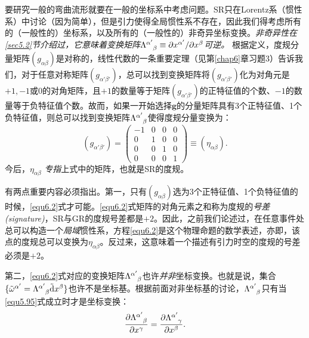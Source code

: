 要研究一般的弯曲流形就要在一般的坐标系中考虑问题。SR只在Lorentz系（惯性系）中讨论（因为简单），但是引力使得全局惯性系不存在，因此我们得考虑所有的（一般性的）坐标系，以及所有的（一般性的）非奇异坐标变换。\textit{非奇异性在\ref{sec5.2}节介绍过，它意味着变换矩阵$\Lambda\indices{^{\alpha'}_\beta} \equiv \partial x^{\alpha'} / \partial x^\beta$可逆。} 根据定义，度规分量矩阵$(g_{\alpha \beta})$是对称的，线性代数的一条重要定理（见第\ref{chap6}章习题3）告诉我们，对于任意对称矩阵$(g_{\alpha' \beta'})$，总可以找到变换矩阵将$(g_{\alpha' \beta'})$化为对角元是$+1, -1$或0的对角矩阵，且$+1$的数量等于矩阵$(g_{\alpha' \beta'})$的正特征值的个数、$-1$的数量等于负特征值个数。故而，如果一开始选择$\mathbf{g}$的分量矩阵具有3个正特征值、1个负特征值，则总可以找到变换矩阵$\Lambda\indices{^{\alpha'}_\beta}$使得度规分量变换为：
\begin{equation}
    (g_{\alpha' \beta'}) = 
    \begin{pmatrix}
        -1 & 0 & 0 & 0 \\
        0 & 1 & 0 & 0 \\
        0 & 0 & 1 & 0 \\
        0 & 0 & 0 & 1
    \end{pmatrix}
    \equiv (\eta_{\alpha \beta}).
\label{equ6.2}
\end{equation}
今后，$\eta_{\alpha \beta}$ \textit{专指}上式中的矩阵，也就是SR的度规。

有两点重要内容必须指出。第一，只有$(g_{\alpha \beta})$选为3个正特征值、1个负特征值的时候，\eqref{equ6.2}式才可能。\eqref{equ6.2}式矩阵的对角元素之和称为度规的\textit{号差 (signature)}，SR与GR的度规号差都是$+2$。因此，之前我们论述过，在任意事件处总可以构造一个\textit{局域}惯性系，方程\eqref{equ6.2}是这个物理命题的数学表述，亦即，该点的度规总可以变换为$\eta_{\alpha \beta}$。反过来，这意味着一个描述有引力时空的度规的号差必须是$+2$。

第二，\eqref{equ6.2}式对应的变换矩阵$\Lambda\indices{^{\alpha'}_\beta}$也许\textit{并非}坐标变换。也就是说，集合$\{ \tilde{\omega}^{\alpha'} = \Lambda\indices{^{\alpha'}_\beta} \trd x^\beta \}$也许不是坐标基。根据前面对非坐标基的讨论，$\Lambda\indices{^{\alpha'}_\beta}$只有当\eqref{equ5.95}式成立时才是坐标变换：
\[
    \frac{\partial \Lambda\indices{^{\alpha'}_\beta}}{\partial x^\gamma} = \frac{\partial \Lambda\indices{^{\alpha'}_\gamma}}{\partial x^\beta}.
\]

